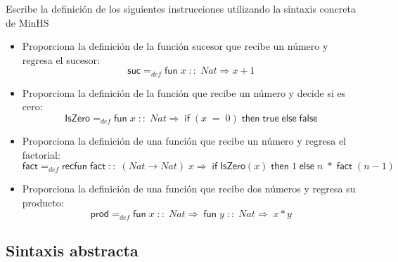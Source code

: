     \begin{exercise}
    Escribe la definición de los siguientes instrucciones utilizando la sintaxis concreta de \textsf{MinHS}\\

	\begin{itemize}
		\item Proporciona la definición de la función sucesor que recibe un número y regresa el sucesor: 
			$$ \textsf{suc} =_{def} \textsf{fun}\; x\;::\; \textit{Nat} \Rightarrow x + 1$$
		\item Proporciona la definición de la función que recibe un número y decide si es cero:
			 $$ \textsf{IsZero} =_{def} \textsf{fun}\; x\;::\; \textit{Nat} \Rightarrow\; \textsf{if}\; (x\; =\; 0) \; \textsf{then}\; \textsf{true}\; \textsf{else}\; \textsf{false}$$
		\item Proporciona la definición de una función que recibe un número y regresa el factorial:
			 $$ \textsf{fact} =_{def} \textsf{recfun}\; \textsf{fact}\; ::\; (\textit{Nat} \rightarrow \textit{Nat})\; x \Rightarrow\; \textsf{if}\; \textsf{IsZero}(x)\; \textsf{then}\; 1\; \textsf{else}\; n\; *\; \textsf{fact}\; (n-1)$$
		\item Proporciona la definición de una función que recibe dos números y regresa su producto:
			$$ \textsf{prod} =_{def} \textsf{fun}\; x\; ::\; Nat \Rightarrow\; \textsf{fun}\; y\; ::\; Nat \Rightarrow\; x*y$$
	\end{itemize}

    \end{exercise}

\subsection{Sintaxis abstracta}

